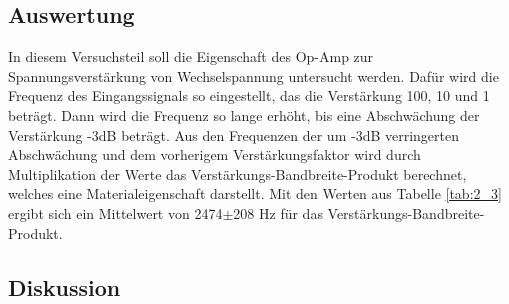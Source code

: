 \documentclass[12pt,a4paper]{article}
\begin{document}
\subsection{Auswertung}

In diesem Versuchsteil soll die Eigenschaft des Op-Amp zur Spannungsverstärkung von Wechselspannung untersucht werden. Dafür wird die Frequenz des Eingangssignals so eingestellt, das die Verstärkung 100, 10 und 1 beträgt. Dann wird die Frequenz so lange erhöht, bis eine Abschwächung der Verstärkung -3dB beträgt. Aus den Frequenzen der um -3dB verringerten Abschwächung und dem vorherigem Verstärkungsfaktor wird durch Multiplikation der Werte das Verstärkungs-Bandbreite-Produkt berechnet, welches eine Materialeigenschaft darstellt.
Mit den Werten aus Tabelle \ref{tab:2_3} ergibt sich ein Mittelwert von 2474$\pm$208 Hz für das Verstärkungs-Bandbreite-Produkt.

\subsection{Diskussion}
\end{document}
